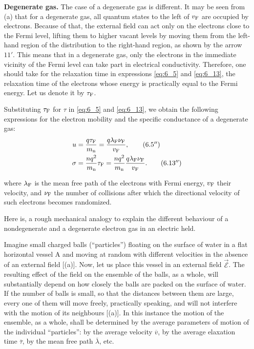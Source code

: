 \textbf{Degenerate gas.} The case of a degenerate gas is different. It may be seen from (a) that for a degenerate gas, all quantum states to the left of $v_{\text{F}}$ are occupied by electrons. Because of that, the external field can act only on the electrons close to the Fermi level, lifting them to higher vacant levels by moving them from the left-hand region of the distribution to the right-hand region, as shown by the arrow $11'$. This means that in a degenerate gas, only the electrons in the immediate vicinity of the Fermi level can take part in electrical conductivity. Therefore, one should take for the relaxation time in expressions \eqref{eq:6_5} and \eqref{eq:6_13}, the relaxation time of the electrons whose energy is practically equal to the Fermi energy. Let us denote it by $\tau_{\text{F}}$.

Substituting $\tau_{\text{F}}$ for $\tau$ in \eqref{eq:6_5} and \eqref{eq:6_13}, we obtain the following expressions for the electron mobility and the specific conductance of a degenerate gas:
\begin{align}
    u &= \frac{q\tau_{\text{F}}}{m_{\text{n}}} = \frac{q\lambda_{\text{F}} \nu_{\text{F}}}{v_{\text{F}}},\tag{6.5$''$}\label{eq:6_5pp}\\
    \sigma &= \frac{n q^2}{m_{\text{n}}} \tau_{\text{F}} = \frac{n q^2}{m_{\text{n}}} \frac{q\lambda_{\text{F}} \nu_{\text{F}}}{v_{\text{F}}}.\tag{6.13$''$}\label{eq:6_13pp}
\end{align}

\noindent
where $\lambda_{\text{F}}$ is the mean free path of the electrons with Fermi energy, $v_{\text{F}}$ their velocity, and $\nu_{\text{F}}$ the number of collisions after which the directional velocity of such electrons becomes randomized.

Here is, a rough mechanical analogy to explain the different behaviour of a nondegenerate and a degenerate electron gas in an electric held.

Imagine small charged balls (``particles'') floating on the surface of water in a flat horizontal vessel A and moving at random with different velocities in the absence of an external field [(a)]. Now, let us place this vessel in an external field $\vec{\mathcal{E}}$. The resulting effect of the field on the ensemble of the balls, as a whole, will substantially depend on how closely the balls are packed on the surface of water. If the number of balls is small, so that the distances between them are large, every one of them will move freely, practically speaking, and will not interfere with the motion of its neighbours [(a)]. In this instance the motion of the ensemble, as a whole, shall be determined by the average parameters of motion of the individual ``particles'': by the average velocity $\overline{v}$, by the average elaxation time $\overline{\tau}$, by the mean free path $\overline{\lambda}$, etc.

